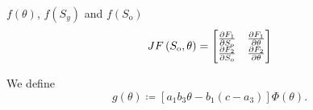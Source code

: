 \documentclass[
    8pt,
    aspectratio=1610,
    c,
    intlimits,
    leqno,
    professionalfonts,
]{beamer}
\begin{document}
\begin{frame}
\begin{block}{$f\left(\theta\right)$,
			$f\left(S_{y}\right)$ and $f\left(S_{\text{o}}\right)$}
		\begin{equation*}
			JF\left(S_{\text{o}},\theta\right)=
			\begin{bmatrix}
				\diffp{F_{1}}{S_{\text{o}}} & \diffp{F_{1}}{\theta} \\
				\diffp{F_{2}}{S_{\text{o}}} & \diffp{F_{2}}{\theta}
			\end{bmatrix}
		\end{equation*}

		We define
		\setcounter{equation}{38}
		\begin{equation}
			g\left(\theta\right)\coloneqq
			\left[
				a_{1}
				b_{3}
				\theta-
				b_{1}
				\left(c-a_{3}\right)
				\right]
			\Phi\left(\theta\right).\label{eq:39}
		\end{equation}
	\end{block}
\end{frame}
\end{document}
